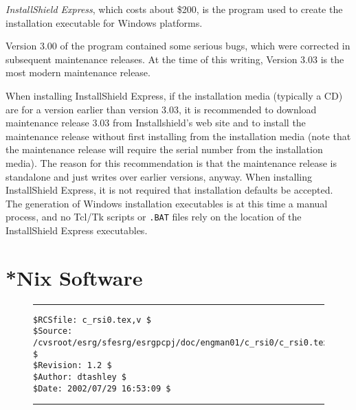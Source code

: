 \emph{InstallShield Express}, which costs about
\$200, is the program used to create
the installation executable for Windows platforms.

Version 3.00 of the program contained some serious bugs, which were
corrected in subsequent maintenance releases.  At the time of this
writing, Version 3.03 is the most modern maintenance release.

When installing InstallShield Express, if the installation media
(typically a CD) are for a version earlier than version 3.03, it is
recommended to download maintenance release 3.03 from 
Installshield's web site and to install the maintenance release
without first installing from the installation media (note that the
maintenance release will require the serial number from the installation
media).  The reason for this recommendation is that the maintenance release
is standalone and just writes over earlier versions, anyway.
When installing InstallShield Express, it is not required that
installation defaults be accepted.  The generation of
Windows installation executables is at this time a manual process,
and no Tcl/Tk 
scripts or  \texttt{.BAT}
files rely on the location of the InstallShield Express executables.


\section{*Nix Software}
\label{crsi0:snix0}





\noindent\begin{figure}[!b]
\noindent\rule[-0.25in]{\textwidth}{1pt}
\begin{tiny}
\begin{verbatim}
$RCSfile: c_rsi0.tex,v $
$Source: /cvsroot/esrg/sfesrg/esrgpcpj/doc/engman01/c_rsi0/c_rsi0.tex,v $
$Revision: 1.2 $
$Author: dtashley $
$Date: 2002/07/29 16:53:09 $
\end{verbatim}
\end{tiny}
\noindent\rule[0.25in]{\textwidth}{1pt}
\end{figure}
%
%

